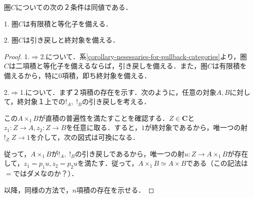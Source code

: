 \documentclass[uplatex, dvipdfmx]{jsarticle}
\begin{document}
\begin{proposition}
    圏$C$についての次の２条件は同値である．

    1. 圏$C$は有限積と等化子を備える．

    2. 圏$C$は引き戻しと終対象を備える．
\end{proposition}
\begin{proof}
    1.$\Rightarrow$2.について．系\ref{corollary-nesessaries-for-pullback-categories}より，圏$C$は二項積と等化子を備えるならば，引き戻しを備える．また，圏$C$は有限積を備えるから，特に$0$項積，即ち終対象を備える．

    2.$\Rightarrow$1.について．まず２項積の存在を示す．次のように，任意の対象$A,B$に対して，終対象１上での$!_A,\;!_B$の引き戻しを考える．
    \begin{center}
    \end{center}
    この$A\times_1B$が直積の普遍性を満たすことを確認する．$Z\in\mathbf{C}$と$z_1:Z\to A,z_2:Z\to B$を任意に取る．すると，$1$が終対象であるから，唯一つの射$!_Z\;Z\to 1$を介して，次の図式は可換になる．
    \begin{center}
    \end{center}
    従って，$A\times_1B$が$!_A,\;!_B$の引き戻しであるから，唯一つの射$u:Z\to A\times_1B$が存在して，$z_1=p_1u,z_2=p_2u$を満たす．従って，$A\times_1B\simeq A\times B$である（この記法は$=$ではダメなのか？）．

    以降，同様の方法で，$n$項積の存在を示せる．


\end{proof}
\end{document}
